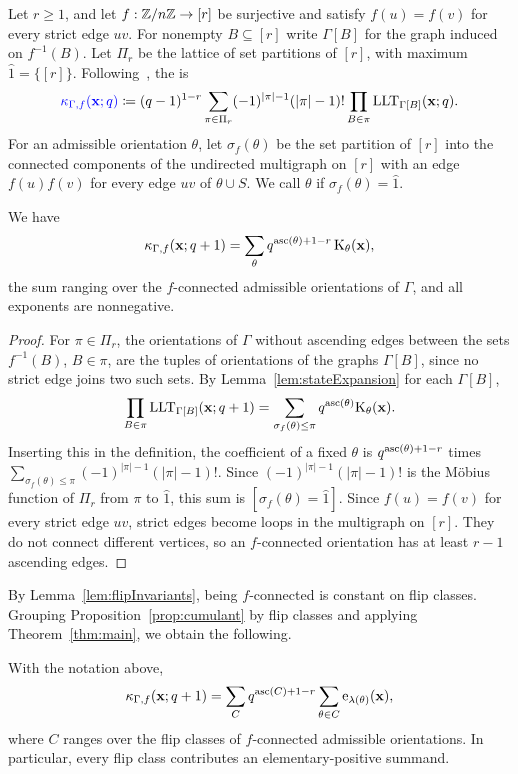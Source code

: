 Let $r\geq1$, and let $f:\mathbb{Z}/n\mathbb{Z}\to[r]$ be surjective and satisfy
$f(u)=f(v)$ for every strict edge $uv$.
For nonempty $B\subseteq[r]$ write $\Gamma[B]$ for the graph induced on
$f^{-1}(B)$.
Let $\Pi_r$ be the lattice of set partitions of $[r]$, with maximum $\hat1=\{[r]\}$.
Following~\cite{DolegaKowalski2021x}, the  is
\[
 \defin{\kappa_{\Gamma,f}(\xvec;q)}\coloneqq(q-1)^{1-r}\sum_{\pi\in\Pi_r}
 (-1)^{|\pi|-1}(|\pi|-1)!\prod_{B\in\pi}\LLT_{\Gamma[B]}(\xvec;q).
\]
For an admissible orientation $\theta$, let $\sigma_f(\theta)$ be the set partition of
$[r]$ into the connected components of the undirected multigraph on $[r]$ with an
edge $f(u)f(v)$ for every edge $uv$ of $\theta\cup S$.
We call $\theta$  if $\sigma_f(\theta)=\hat1$.

\begin{proposition}\label{prop:cumulant}
We have
\[
 \kappa_{\Gamma,f}(\mathbf{x};q+1)=\sum_{\theta}q^{\operatorname{asc}(\theta)+1-r}\,\mathrm{K}_{\theta}(\mathbf{x}),
\]
the sum ranging over the $f$-connected admissible orientations of $\Gamma$, and all
exponents are nonnegative.
\end{proposition}

\begin{proof}
For $\pi\in\Pi_r$, the orientations of $\Gamma$ without ascending edges between
the sets $f^{-1}(B)$, $B\in\pi$, are the tuples of orientations of the graphs
$\Gamma[B]$, since no strict edge joins two such sets.
By Lemma~\ref{lem:stateExpansion} for each $\Gamma[B]$,
\[
 \prod_{B\in\pi}\operatorname{LLT}_{\Gamma[B]}(\mathbf{x};q+1)
 =\sum_{\sigma_f(\theta)\leq\pi}q^{\operatorname{asc}(\theta)}\mathrm{K}_{\theta}(\mathbf{x}).
\]
Inserting this in the definition, the coefficient of a fixed $\theta$ is
$q^{\operatorname{asc}(\theta)+1-r}$ times
$\sum_{\sigma_f(\theta)\leq\pi}(-1)^{|\pi|-1}(|\pi|-1)!$.
Since $(-1)^{|\pi|-1}(|\pi|-1)!$ is the Möbius function of $\Pi_r$ from $\pi$ to
$\hat1$, this sum is $[\sigma_f(\theta)=\hat1]$.
Since $f(u)=f(v)$ for every strict edge $uv$, strict edges become loops in the
multigraph on $[r]$.
They do not connect different vertices, so an $f$-connected orientation has at
least $r-1$ ascending edges.
\end{proof}

By Lemma~\ref{lem:flipInvariants}, being $f$-connected is constant on flip classes.
Grouping Proposition~\ref{prop:cumulant} by flip classes and applying
Theorem~\ref{thm:main}, we obtain the following.

\begin{corollary}\label{cor:cumulant}
With the notation above,
\[
 \kappa_{\Gamma,f}(\mathbf{x};q+1)=\sum_Cq^{\operatorname{asc}(C)+1-r}\sum_{\theta\in C}
 \mathrm{e}_{\lambda(\theta)}(\mathbf{x}),
\]
where $C$ ranges over the flip classes of $f$-connected admissible orientations.
In particular, every flip class contributes an elementary-positive summand.
\end{corollary}

